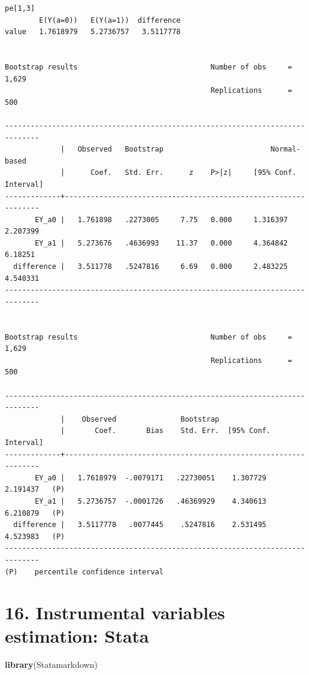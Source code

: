 \documentclass[
  10pt,
]{book}
\newenvironment{Shaded}{\begin{snugshade}}{\end{snugshade}}
\newcommand{\KeywordTok}[1]{\textcolor[rgb]{0.13,0.29,0.53}{\textbf{#1}}}
\newcommand{\NormalTok}[1]{#1}
\begin{document}
\begin{verbatim}
pe[1,3]
        E(Y(a=0))   E(Y(a=1))  difference
value   1.7618979   5.2736757   3.5117778


Bootstrap results                               Number of obs     =      1,629
                                                Replications      =        500

------------------------------------------------------------------------------
             |   Observed   Bootstrap                         Normal-based
             |      Coef.   Std. Err.      z    P>|z|     [95% Conf. Interval]
-------------+----------------------------------------------------------------
       EY_a0 |   1.761898   .2273005     7.75   0.000     1.316397    2.207399
       EY_a1 |   5.273676   .4636993    11.37   0.000     4.364842     6.18251
  difference |   3.511778   .5247816     6.69   0.000     2.483225    4.540331
------------------------------------------------------------------------------


Bootstrap results                               Number of obs     =      1,629
                                                Replications      =        500

------------------------------------------------------------------------------
             |    Observed               Bootstrap
             |       Coef.       Bias    Std. Err.  [95% Conf. Interval]
-------------+----------------------------------------------------------------
       EY_a0 |   1.7618979  -.0079171   .22730051    1.307729   2.191437   (P)
       EY_a1 |   5.2736757  -.0001726   .46369929    4.340613   6.210879   (P)
  difference |   3.5117778   .0077445    .5247816    2.531495   4.523983   (P)
------------------------------------------------------------------------------
(P)    percentile confidence interval
\end{verbatim}

\hypertarget{instrumental-variables-estimation-stata}{%
\chapter*{16. Instrumental variables estimation: Stata}\label{instrumental-variables-estimation-stata}}

\begin{Shaded}
\begin{Highlighting}[]
\KeywordTok{library}\NormalTok{(Statamarkdown)}
\end{Highlighting}
\end{Shaded}
\end{document}

